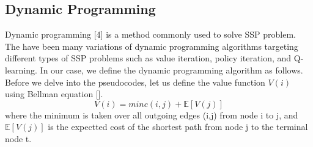 \documentclass{article}
\begin{document}
\subsection{Dynamic Programming}
Dynamic programming [4] is a method commonly used to solve SSP problem. The have been many variations of 
dynamic programming algorithms targeting different types of SSP problems such as value iteration, policy iteration,
and Q-learning. In our case, we define the dynamic programming algorithm as follows. Before 
we delve into the pseudocodes, let us define the value function $V(i)$ using Bellman equation [].
\begin{equation}
  V(i) = minc(i,j) + \mathbb{E}[V(j)]
\end{equation}
where the minimum is taken over all outgoing edges (i,j) from node i to j, and $\mathbb{E}[V(j)]$ is the expectted cost of the 
shortest path from node j to the terminal node t. 
\end{document}

